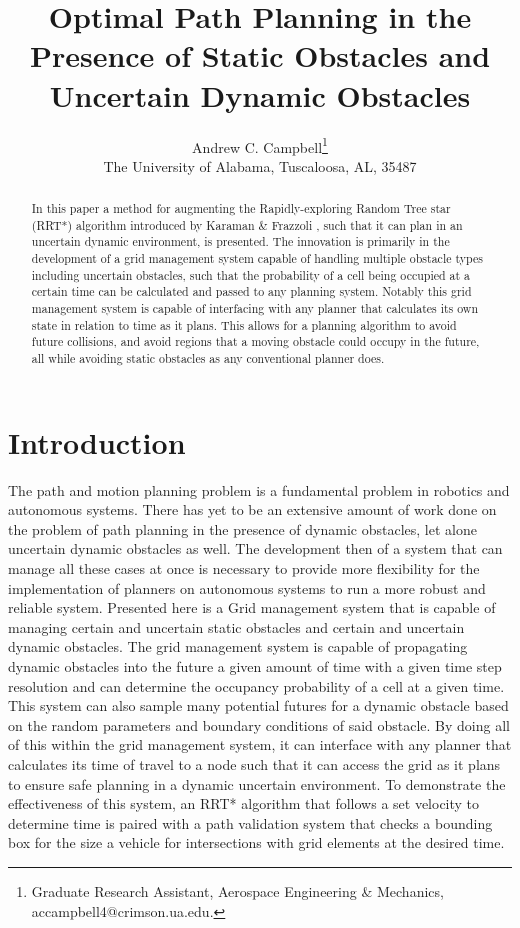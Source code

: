 \documentclass{aiaa-tc}
\title{Optimal Path Planning in the Presence of Static Obstacles and Uncertain Dynamic Obstacles}
\author{Andrew C. Campbell\thanks{Graduate Research Assistant, Aerospace Engineering \& Mechanics, accampbell4@crimson.ua.edu.}\\The University of Alabama, Tuscaloosa, AL, 35487}
\begin{document}
\maketitle

\begin{abstract}
In this paper a method for augmenting the Rapidly-exploring Random Tree star (RRT*) algorithm introduced by Karaman \& Frazzoli \cite{doi:10.1177/0278364911406761}, such that 
it can plan in an uncertain dynamic environment, is presented. The innovation is primarily in the development of a grid management system capable of handling
multiple obstacle types including uncertain obstacles, such that the probability of a cell being occupied at a certain time can be calculated and passed to any planning system.
Notably this grid management system is capable of interfacing with any planner that calculates its own state in relation to time as it plans. This allows for a planning algorithm to
avoid future collisions, and avoid regions that a moving obstacle could occupy in the future, all while avoiding static obstacles as any conventional planner does.
\end{abstract}

\section{Introduction}
The path and motion planning problem is a fundamental problem in robotics and autonomous systems.
There has yet to be an extensive amount of work done on the problem of path planning in the presence 
of dynamic obstacles,
let alone uncertain dynamic obstacles as well. 
The development then of a system that can manage all these cases
at once is necessary to provide more flexibility
for the implementation of planners on autonomous systems to run a more robust and reliable system. 
Presented here is a Grid management system that is capable of managing certain and uncertain static obstacles
and certain and uncertain dynamic obstacles. The grid management system is capable of propagating dynamic
obstacles into the future a given amount of time with a given time step resolution and can determine the 
occupancy probability of a cell at a given time. This system can also sample many potential futures for a 
dynamic obstacle based on the random parameters and boundary conditions of said obstacle. By doing 
all of this within the grid management system, it can interface with any planner that calculates its time 
of travel to a node such that it can access the grid as it plans to ensure safe planning in a dynamic uncertain environment.
To demonstrate the effectiveness of this system, an RRT* algorithm that follows a set velocity to determine time
is paired with a path validation system that checks a bounding box for the size a vehicle for intersections with grid elements at
the desired time.
\end{document}
